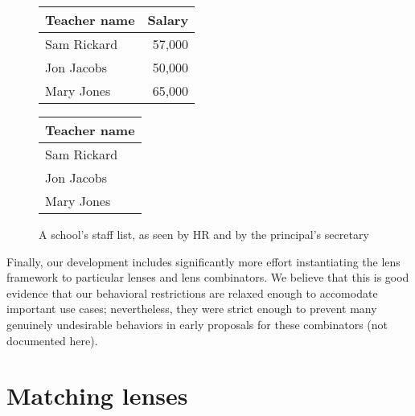 \begin{figure}
    \begin{minipage}{0.5\linewidth}
        \centering
        \begin{tabular}{lr}
            Teacher name & Salary \\
            \hline
            Sam Rickard & 57,000 \\
            Jon Jacobs & 50,000 \\
            Mary Jones & 65,000 \\
        \end{tabular}
        \label{fig:school-salaries-delins-hr}
    \end{minipage}%
    \begin{minipage}{0.5\linewidth}
        \centering
        \begin{tabular}{l}
            Teacher name \\
            \hline
            Sam Rickard \\
            Jon Jacobs \\
            Mary Jones \\
        \end{tabular}
        \label{fig:school-salaries-delins-sec-pre}
    \end{minipage}%
    \caption{A school's staff list, as seen by HR and by the principal's secretary}
    \label{fig:school-salaries-delins}
\end{figure}

Finally, our development includes significantly more effort instantiating
the lens framework to particular lenses and lens combinators. We believe
that this is good evidence that our behavioral restrictions are relaxed
enough to accomodate important use cases; nevertheless, they were strict
enough to prevent many genuinely undesirable behaviors in early proposals
for these combinators (not documented here).


\section{Matching lenses}
\label{sec:matching}

